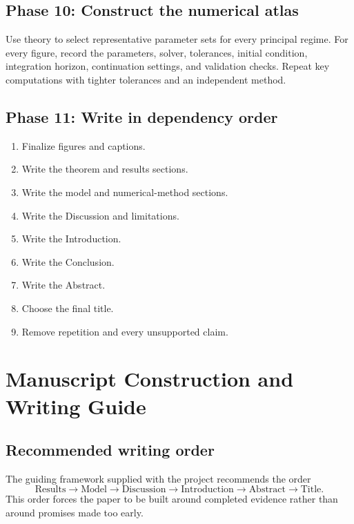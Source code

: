 \documentclass[11pt, reqno]{amsart}
\theoremstyle{definition}
\theoremstyle{remark}
\begin{document}
\subsection{Phase 10: Construct the numerical atlas}

Use theory to select representative parameter sets for every principal regime.
For every figure, record the parameters, solver, tolerances, initial condition,
integration horizon, continuation settings, and validation checks.  Repeat key
computations with tighter tolerances and an independent method.

\subsection{Phase 11: Write in dependency order}

\begin{enumerate}[label=11.\arabic*,leftmargin=3em]
    \item Finalize figures and captions.
    \item Write the theorem and results sections.
    \item Write the model and numerical-method sections.
    \item Write the Discussion and limitations.
    \item Write the Introduction.
    \item Write the Conclusion.
    \item Write the Abstract.
    \item Choose the final title.
    \item Remove repetition and every unsupported claim.
\end{enumerate}

\section{Manuscript Construction and Writing Guide}
\label{app:writing-guide}

\subsection{Recommended writing order}

The guiding framework supplied with the project recommends the order
\[
    \text{Results}
    \longrightarrow
    \text{Model}
    \longrightarrow
    \text{Discussion}
    \longrightarrow
    \text{Introduction}
    \longrightarrow
    \text{Abstract}
    \longrightarrow
    \text{Title}.
\]
This order forces the paper to be built around completed evidence rather than
around promises made too early.
\end{document}
